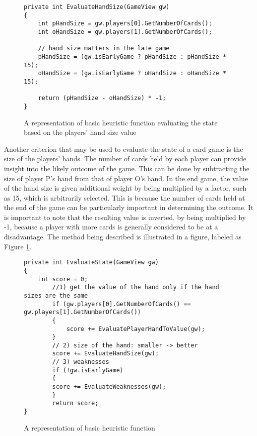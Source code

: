 \begin{figure}[h]
\captionsetup{justification=centering}
\begin{lstlisting}
private int EvaluateHandSize(GameView gw)
{
	int pHandSize = gw.players[0].GetNumberOfCards();
	int oHandSize = gw.players[1].GetNumberOfCards();

	// hand size matters in the late game
	pHandSize = (gw.isEarlyGame ? pHandSize : pHandSize * 15);
	oHandSize = (gw.isEarlyGame ? oHandSize : oHandSize * 15);

	return (pHandSize - oHandSize) * -1;
}
\end{lstlisting}
\caption{A representation of basic heuristic function evaluating the state based on the players' hand size value}
\label{fig:BHPlayerHandSize}
\end{figure}

Another criterion that may be used to evaluate the state of a card game is the size of the players' hands. The number of cards held by each player can provide insight into the likely outcome of the game. This can be done by subtracting the size of player P's hand from that of player O's hand. In the end game, the value of the hand size is given additional weight by being multiplied by a factor, such as 15, which is arbitrarily selected. This is because the number of cards held at the end of the game can be particularly important in determining the outcome. It is important to note that the resulting value is inverted, by being multiplied by -1, because a player with more cards is generally considered to be at a disadvantage. The method being described is illustrated in a figure, labeled as Figure \ref{fig:BHPlayerHandSize}.

\begin{figure}[h]
\captionsetup{justification=centering}
\begin{lstlisting}
private int EvaluateState(GameView gw)
{
	int score = 0;
    	//1) get the value of the hand only if the hand sizes are the same
    	if (gw.players[0].GetNumberOfCards() == gw.players[1].GetNumberOfCards())
    	{
    	    score += EvaluatePlayerHandToValue(gw);
    	}
    	// 2) size of the hand: smaller -> better 
    	score += EvaluateHandSize(gw);
    	// 3) weaknesses 
    	if (!gw.isEarlyGame)
    	{
       	score += EvaluateWeaknesses(gw);
    	}
    	return score;
}
\end{lstlisting}
\caption{A representation of basic heuristic function}
\label{fig:basicEval}
\end{figure}

